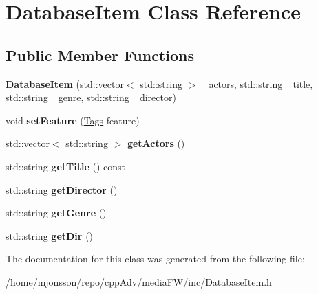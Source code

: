\hypertarget{classDatabaseItem}{}\section{Database\+Item Class Reference}
\label{classDatabaseItem}
\subsection*{Public Member Functions}
\begin{DoxyCompactItemize}
\item 
\mbox{\label{classDatabaseItem_abb8e57f5ec53e855c541e5b27c4dfe10}} 
{\bfseries Database\+Item} (std\+::vector$<$ std\+::string $>$ \+\_\+actors, std\+::string \+\_\+title, std\+::string \+\_\+genre, std\+::string \+\_\+director)
\item 
\mbox{\label{classDatabaseItem_a51f4dbeb282806b7ac10e6b49b90eeef}} 
void {\bfseries set\+Feature} (\hyperlink{structTags}{Tags} feature)
\item 
\mbox{\label{classDatabaseItem_a98560961c4ab1266fe9b10f094bea568}} 
std\+::vector$<$ std\+::string $>$ {\bfseries get\+Actors} ()
\item 
\mbox{\label{classDatabaseItem_a87f2ebf677aaec4bc2e95eea2b7bd329}} 
std\+::string {\bfseries get\+Title} () const
\item 
\mbox{\label{classDatabaseItem_a7edc61bf54ac2e48e921b9948d9efecb}} 
std\+::string {\bfseries get\+Director} ()
\item 
\mbox{\label{classDatabaseItem_ac1d9f64c889ed271aa0f586a62a2c82a}} 
std\+::string {\bfseries get\+Genre} ()
\item 
\mbox{\label{classDatabaseItem_afcca0a554ac65bdcf796480e8d2920f4}} 
std\+::string {\bfseries get\+Dir} ()
\end{DoxyCompactItemize}


The documentation for this class was generated from the following file\+:\begin{DoxyCompactItemize}
\item 
/home/mjonsson/repo/cpp\+Adv/media\+F\+W/inc/Database\+Item.\+h\end{DoxyCompactItemize}
